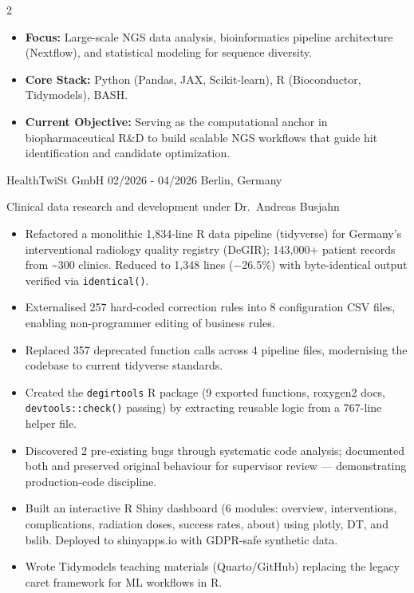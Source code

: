 \documentclass{thejus_cv}
\begin{document}
\begin{paracol}{2}


\begin{itemize}[label=\textbullet, leftmargin=1em]
    \item \textbf{Focus:} Large-scale NGS data analysis, bioinformatics pipeline architecture (Nextflow), and statistical modeling for sequence diversity.
    \item \textbf{Core Stack:} Python (Pandas, JAX, Scikit-learn), R (Bioconductor, Tidymodels), BASH.
    \item \textbf{Current Objective:} Serving as the computational anchor in biopharmaceutical R\&D to build scalable NGS workflows that guide hit identification and candidate optimization.
\end{itemize}


             {HealthTwiSt GmbH}
             {02/2026 - 04/2026}
             {Berlin, Germany}
             {Clinical data research and development under Dr.~Andreas Busjahn
             \begin{itemize}
                   \item Refactored a monolithic 1,834-line R data pipeline (tidyverse) for Germany's interventional radiology quality registry (DeGIR); 143,000+ patient records from \textasciitilde300 clinics. Reduced to 1,348 lines ($-$26.5\%) with byte-identical output verified via \texttt{identical()}.
                   \item Externalised 257 hard-coded correction rules into 8 configuration CSV files, enabling non-programmer editing of business rules.
                   \item Replaced 357 deprecated function calls across 4 pipeline files, modernising the codebase to current tidyverse standards.
                   \item Created the \texttt{degirtools} R package (9 exported functions, roxygen2 docs, \texttt{devtools::check()} passing) by extracting reusable logic from a 767-line helper file.
                   \item Discovered 2 pre-existing bugs through systematic code analysis; documented both and preserved original behaviour for supervisor review --- demonstrating production-code discipline.
                   \item Built an interactive R Shiny dashboard (6 modules: overview, interventions, complications, radiation doses, success rates, about) using plotly, DT, and bslib. Deployed to shinyapps.io with GDPR-safe synthetic data.
                   \item Wrote Tidymodels teaching materials (Quarto/GitHub) replacing the legacy caret framework for ML workflows in R.
               \end{itemize}}


\end{paracol}
\end{document}
